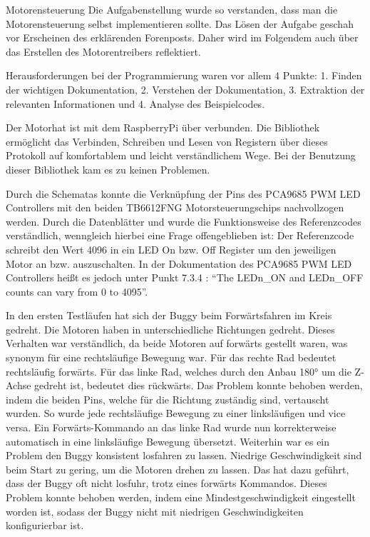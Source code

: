 \documentclass[12pt]{report}
\begin{document}
\begin{section}{Motorensteuerung}
  Die Aufgabenstellung wurde so verstanden, dass man die Motorensteuerung
  selbst implementieren sollte. Das Lösen der Aufgabe geschah vor Erscheinen des
  erklärenden Forenposts. Daher wird im Folgendem auch über das Erstellen des
  Motorentreibers reflektiert.

  Herausforderungen bei der Programmierung waren vor allem 4 Punkte: 1. Finden der wichtigen
  Dokumentation, 2. Verstehen der Dokumentation, 3. Extraktion der relevanten
  Informationen und 4. Analyse des Beispielcodes.

  Der Motorhat ist mit dem RaspberryPi über \itoc{} verbunden. Die
  \wiringPi{}\cite{wiringPi} Bibliothek ermöglicht das Verbinden, Schreiben und Lesen von
  Registern über dieses Protokoll auf komfortablem und leicht verständlichem Wege.
  Bei der Benutzung dieser Bibliothek kam es zu keinen Problemen.
  
  Durch die Schematas \cite{motorhatDownloads}
  konnte die Verknüpfung der Pins des PCA9685 PWM LED Controllers mit den beiden
  TB6612FNG Motorsteuerungschips nachvollzogen werden.
  Durch die Datenblätter \cite{datasheetPCA9685} und \cite{datasheetTB6612}
  wurde die Funktionsweise des Referenzcodes \cite{referenzcode}
  verständlich, wenngleich hierbei eine Frage offengeblieben ist:
  Der Referenzcode schreibt den Wert 4096 in ein LED On bzw. Off Register um den
  jeweiligen Motor an bzw. auszuschalten. In der Dokumentation des PCA9685 PWM LED
  Controllers heißt es jedoch unter Punkt 7.3.4 : "`The LEDn\_ON and LEDn\_OFF
  counts can vary from 0 to 4095"'.

  In den ersten Testläufen hat sich der Buggy beim Forwärtsfahren im Kreis
  gedreht. Die Motoren haben in unterschiedliche Richtungen gedreht. Dieses
  Verhalten war verständlich, da beide Motoren auf forwärts gestellt waren, was
  synonym für eine rechtsläufige Bewegung war. Für das rechte Rad bedeutet
  rechtsläufig forwärts. Für das linke Rad, welches durch den Anbau 
  \ang{180} um die Z-Achse gedreht ist, bedeutet dies rückwärts.
  Das Problem konnte behoben werden, indem die beiden Pins, welche für die Richtung
  zuständig sind, vertauscht wurden. So wurde jede rechtsläufige Bewegung zu einer
  linksläufigen und vice versa. Ein Forwärts-Kommando an das linke Rad wurde nun
  korrekterweise automatisch in eine linksläufige Bewegung übersetzt.
  Weiterhin war es ein Problem den Buggy konsistent losfahren zu lassen. Niedrige 
  Geschwindigkeit sind beim Start zu gering, um die Motoren drehen zu
  lassen. Das hat dazu geführt, dass der Buggy oft nicht losfuhr, trotz eines
  forwärts Kommandos. Dieses Problem konnte behoben werden, indem eine Mindestgeschwindigkeit
  eingestellt worden ist, sodass der Buggy nicht mit niedrigen Geschwindigkeiten
  konfigurierbar ist.


\end{section}
\end{document}
